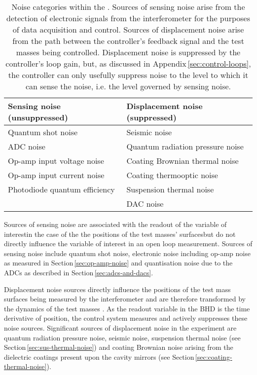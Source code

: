 \begin{table}
  \centering
  \begin{tabular}{l|l}
    \textbf{Sensing noise (unsuppressed)}        & \textbf{Displacement noise (suppressed)} \\
    \hline
    Quantum shot noise            & Seismic noise \\
    \gls{ADC} noise               & Quantum radiation pressure noise \\
    Op-amp input voltage noise    & Coating Brownian thermal noise \\
    Op-amp input current noise    & Coating thermooptic noise \\
    Photodiode quantum efficiency & Suspension thermal noise \\
                                  & \gls{DAC} noise \\
  \end{tabular}
  \caption[Noise categories within the \SSMEXPT{}]{\label{tab:noise-categories}Noise categories within the \SSMEXPT{}. Sources of sensing noise arise from the detection of electronic signals from the interferometer for the purposes of data acquisition and control. Sources of displacement noise arise from the path between the controller's feedback signal and the test masses being controlled. Displacement noise is suppressed by the controller's loop gain, but, as discussed in Appendix\,\ref{sec:control-loops}, the controller can only usefully suppress noise to the level to which it can sense the noise, i.e. the level governed by sensing noise.}
\end{table}

Sources of sensing noise are associated with the readout of the variable of interest\textemdash in the case of the \SSM{} the positions of the test masses' surfaces\textemdash but do not directly influence the variable of interest in an open loop measurement. Sources of sensing noise include quantum shot noise, electronic noise including op-amp noise as measured in Section\,\ref{sec:op-amp-noise} and quantisation noise due to the \glspl{ADC} as described in Section\,\ref{sec:adcs-and-dacs}.

Displacement noise sources directly influence the positions of the test mass surfaces being measured by the interferometer and are therefore transformed by the dynamics of the test masses \cite{Danilishin2015}. As the readout variable in the \gls{BHD} is the time derivative of position, the control system measures and actively suppresses these noise sources. Significant sources of displacement noise in the \SSM{} experiment are quantum radiation pressure noise, seismic noise, suspension thermal noise (see Section\,\ref{sec:sus-thermal-noise}) and coating Brownian noise arising from the dielectric coatings present upon the cavity mirrors (see Section\,\ref{sec:coating-thermal-noise}).

